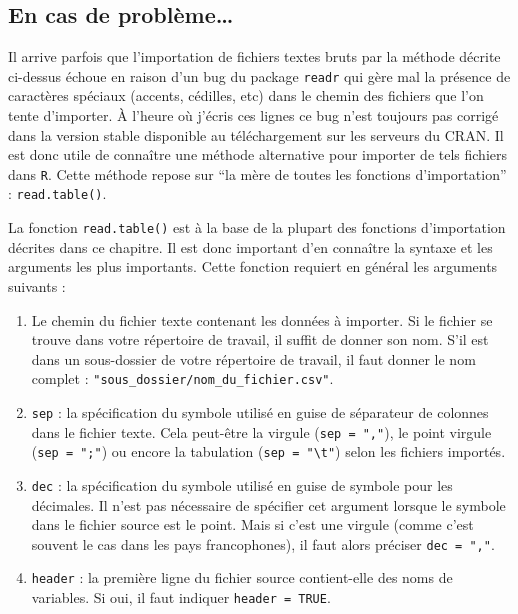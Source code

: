 \documentclass[
  a4paper,
  DIV=11,
  numbers=noendperiod,
  oneside]{scrreprt}
\providecommand{\tightlist}{%
  \setlength{\itemsep}{0pt}\setlength{\parskip}{0pt}}\usepackage{longtable,booktabs,array}
\begin{document}
\subsection{En cas de problème\ldots{}}\label{importproblem}

Il arrive parfois que l'importation de fichiers textes bruts par la
méthode décrite ci-dessus échoue en raison d'un bug du package
\texttt{readr} qui gère mal la présence de caractères spéciaux (accents,
cédilles, etc) dans le chemin des fichiers que l'on tente d'importer. À
l'heure où j'écris ces lignes ce bug n'est toujours pas corrigé dans la
version stable disponible au téléchargement sur les serveurs du CRAN. Il
est donc utile de connaître une méthode alternative pour importer de
tels fichiers dans \texttt{R}. Cette méthode repose sur ``la mère de
toutes les fonctions d'importation'' : \texttt{read.table()}.

La fonction \texttt{read.table()} est à la base de la plupart des
fonctions d'importation décrites dans ce chapitre. Il est donc important
d'en connaître la syntaxe et les arguments les plus importants. Cette
fonction requiert en général les arguments suivants :

\begin{enumerate}
\def\labelenumi{\arabic{enumi}.}
\tightlist
\item
  Le chemin du fichier texte contenant les données à importer. Si le
  fichier se trouve dans votre répertoire de travail, il suffit de
  donner son nom. S'il est dans un sous-dossier de votre répertoire de
  travail, il faut donner le nom complet :
  \texttt{"sous\_dossier/nom\_du\_fichier.csv"}.
\item
  \texttt{sep} : la spécification du symbole utilisé en guise de
  séparateur de colonnes dans le fichier texte. Cela peut-être la
  virgule (\texttt{sep\ =\ ","}), le point virgule
  (\texttt{sep\ =\ ";"}) ou encore la tabulation
  (\texttt{sep\ =\ "\textbackslash{}t"}) selon les fichiers importés.
\item
  \texttt{dec} : la spécification du symbole utilisé en guise de symbole
  pour les décimales. Il n'est pas nécessaire de spécifier cet argument
  lorsque le symbole dans le fichier source est le point. Mais si c'est
  une virgule (comme c'est souvent le cas dans les pays francophones),
  il faut alors préciser \texttt{dec\ =\ ","}.
\item
  \texttt{header} : la première ligne du fichier source contient-elle
  des noms de variables. Si oui, il faut indiquer
  \texttt{header\ =\ TRUE}.
\end{enumerate}
\end{document}
